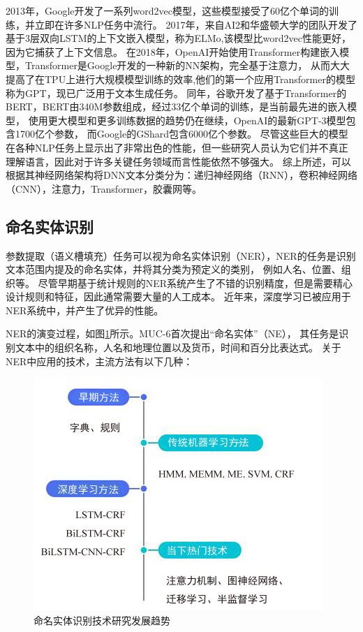 2013年，Google开发了一系列word2vec模型\cite{mikolov2013distributed}，这些模型接受了60亿个单词的训练，并立即在许多NLP任务中流行。 
2017年，来自AI2和华盛顿大学的团队开发了基于3层双向LSTM的上下文嵌入模型，称为ELMo\cite{peters2018deep},该模型比word2vec性能更好，因为它捕获了上下文信息。
在2018年，OpenAI开始使用Transformer\cite{vaswani2017attention}构建嵌入模型，Transformer是Google开发的一种新的NN架构，完全基于注意力，
从而大大提高了在TPU上进行大规模模型训练的效率,他们的第一个应用Transformer的模型称为GPT\cite{radford2018improving}，现已广泛用于文本生成任务。
同年，谷歌开发了基于Transformer的BERT\cite{devlin2018bert}，BERT由340M参数组成，经过33亿个单词的训练，是当前最先进的嵌入模型，
使用更大模型和更多训练数据的趋势仍在继续，OpenAI的最新GPT-3模型\cite{brown2020language}包含1700亿个参数，
而Google的GShard\cite{lepikhin2020gshard}包含6000亿个参数。
尽管这些巨大的模型在各种NLP任务上显示出了非常出色的性能，但一些研究人员认为它们并不真正理解语言，因此对于许多关键任务领域而言性能依然不够强大。
综上所述，可以根据其神经网络架构将DNN文本分类分为：递归神经网络（RNN），卷积神经网络（CNN），注意力，Transformer，胶囊网等。


\subsection{命名实体识别}
参数提取（语义槽填充）任务可以视为命名实体识别（NER），NER的任务是识别文本范围内提及的命名实体，并将其分类为预定义的类别，
例如人名、位置、组织等。
尽管早期基于统计规则的NER系统产生了不错的识别精度，但是需要精心设计规则和特征，因此通常需要大量的人工成本。
近年来，深度学习已被应用于NER系统中，并产生了优异的性能。

NER的演变过程，如图\ref{fig:nerp}所示。MUC-6首次提出“命名实体”（NE），
其任务是识别文本中的组织名称，人名和地理位置以及货币，时间和百分比表达式。
关于NER中应用的技术，主流方法有以下几种：

\begin{figure}[htbp]
  \centering
  \includegraphics[scale=1]{./images/nerp.jpg}
  \caption{命名实体识别技术研究发展趋势\cite{nadeau2007survey}}
  \label{fig:nerp}
\end{figure}

